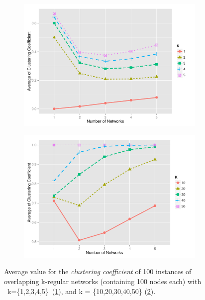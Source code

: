 \documentclass[preprint,number]{elsarticle}
\begin{document}
\begin{figure}[H]
	\centering
	\begin{subfigure}{.5\linewidth}
		\centering
		\includegraphics[width=1\linewidth]{"../analysis/pdf/network_properties_cc_line_kreg_12345"}
		\caption{}
		\label{fig:network_properties_cc_line_kreg_12345}
	\end{subfigure}%
	\begin{subfigure}{.5\linewidth}
		\centering
		\includegraphics[width=1\linewidth]{"../analysis/pdf/network_properties_cc_line_kreg_1020304050"}
		\caption{}
		\label{fig:network_properties_cc_line_kreg_1020304050}
	\end{subfigure}
	\begin{minipage}{0.9\textwidth}
		\vspace{0.2cm}
		\caption{Average value for the \textit{clustering coefficient} of 100 instances of overlapping k-regular networks (containing 100 nodes each) with ~k=\{1,2,3,4,5\}~(\ref{fig:network_properties_cc_line_kreg_12345}), and  k = \{10,20,30,40,50\} (\ref{fig:network_properties_cc_line_kreg_1020304050}).}
		\label{fig:network_properties_cc_line_kreg}
	\end{minipage}
\end{figure}
\end{document}
